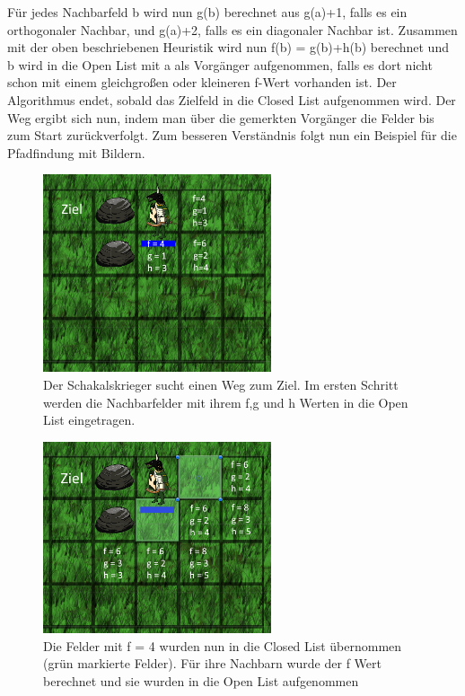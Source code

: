 \documentclass[extern,palatino]{cgBA}
\begin{document}
Für jedes Nachbarfeld b wird nun g(b) berechnet aus g(a)+1, falls es ein orthogonaler Nachbar, und g(a)+2, falls es ein diagonaler Nachbar ist. Zusammen mit der oben beschriebenen Heuristik wird nun f(b) = g(b)+h(b) berechnet und b wird in die Open List mit a als Vorgänger aufgenommen, falls es dort nicht schon mit einem gleichgroßen oder kleineren f-Wert vorhanden ist. Der Algorithmus endet, sobald das Zielfeld in die Closed List aufgenommen wird. Der Weg ergibt sich nun, indem man über die gemerkten Vorgänger die Felder bis zum Start zurückverfolgt. Zum besseren Verständnis folgt nun ein Beispiel für die Pfadfindung mit Bildern.
\begin{figure}[H]
		\centering
		\includegraphics[width=0.6\textwidth]{pathfinding1.png}
		\caption{Der Schakalskrieger sucht einen Weg zum Ziel. Im ersten Schritt werden die Nachbarfelder mit ihrem f,g und h Werten in die Open List eingetragen.}
		\label{pathfinding1}
\end{figure}
\begin{figure}[H]
		\centering
		\includegraphics[width=0.6\textwidth]{pathfinding2.png}
		\caption{Die Felder mit f = 4 wurden nun in die Closed List übernommen (grün markierte Felder). Für ihre Nachbarn wurde der f Wert berechnet und sie wurden in die Open List aufgenommen}
		\label{pathfinding2}
\end{figure}
\end{document}
